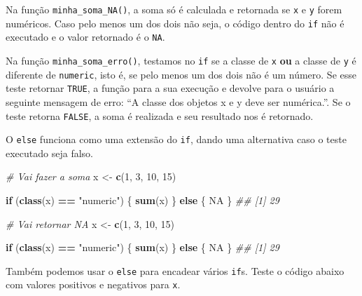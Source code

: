 \documentclass[]{book}
\newenvironment{Shaded}{\begin{snugshade}}{\end{snugshade}}
\newcommand{\CommentTok}[1]{\textcolor[rgb]{0.56,0.35,0.01}{\textit{#1}}}
\newcommand{\ControlFlowTok}[1]{\textcolor[rgb]{0.13,0.29,0.53}{\textbf{#1}}}
\newcommand{\DecValTok}[1]{\textcolor[rgb]{0.00,0.00,0.81}{#1}}
\newcommand{\KeywordTok}[1]{\textcolor[rgb]{0.13,0.29,0.53}{\textbf{#1}}}
\newcommand{\NormalTok}[1]{#1}
\newcommand{\OperatorTok}[1]{\textcolor[rgb]{0.81,0.36,0.00}{\textbf{#1}}}
\newcommand{\OtherTok}[1]{\textcolor[rgb]{0.56,0.35,0.01}{#1}}
\newcommand{\StringTok}[1]{\textcolor[rgb]{0.31,0.60,0.02}{#1}}
\begin{document}
Na função \texttt{minha\_soma\_NA()}, a soma só é calculada e retornada se \texttt{x} e \texttt{y} forem numéricos. Caso pelo menos um dos dois não seja, o código dentro do \texttt{if} não é executado e o valor retornado é o \texttt{NA}.

Na função \texttt{minha\_soma\_erro()}, testamos no \texttt{if} se a classe de \texttt{x} \textbf{ou} a classe de \texttt{y} é diferente de \texttt{numeric}, isto é, se pelo menos um dos dois não é um número. Se esse teste retornar \texttt{TRUE}, a função para a sua execução e devolve para o usuário a seguinte mensagem de erro: ``A classe dos objetos x e y deve ser numérica.''. Se o teste retorna \texttt{FALSE}, a soma é realizada e seu resultado nos é retornado.

O \texttt{else} funciona como uma extensão do \texttt{if}, dando uma alternativa caso o teste executado seja falso.

\begin{Shaded}
\begin{Highlighting}[]
\CommentTok{# Vai fazer  a soma}
\NormalTok{x <-}\StringTok{ }\KeywordTok{c}\NormalTok{(}\DecValTok{1}\NormalTok{, }\DecValTok{3}\NormalTok{, }\DecValTok{10}\NormalTok{, }\DecValTok{15}\NormalTok{)}

\ControlFlowTok{if}\NormalTok{ (}\KeywordTok{class}\NormalTok{(x) }\OperatorTok{==}\StringTok{ "numeric"}\NormalTok{) \{}
  \KeywordTok{sum}\NormalTok{(x)}
\NormalTok{\} }\ControlFlowTok{else}\NormalTok{ \{}
  \OtherTok{NA}
\NormalTok{\}}
\CommentTok{## [1] 29}

\CommentTok{# Vai retornar NA}
\NormalTok{x <-}\StringTok{ }\KeywordTok{c}\NormalTok{(}\DecValTok{1}\NormalTok{, }\DecValTok{3}\NormalTok{, }\DecValTok{10}\NormalTok{, }\DecValTok{15}\NormalTok{)}

\ControlFlowTok{if}\NormalTok{ (}\KeywordTok{class}\NormalTok{(x) }\OperatorTok{==}\StringTok{ "numeric"}\NormalTok{) \{}
  \KeywordTok{sum}\NormalTok{(x)}
\NormalTok{\} }\ControlFlowTok{else}\NormalTok{ \{}
  \OtherTok{NA}
\NormalTok{\}}
\CommentTok{## [1] 29}
\end{Highlighting}
\end{Shaded}

Também podemos usar o \texttt{else} para encadear vários \texttt{if}s. Teste o código abaixo com valores positivos e negativos para \texttt{x}.
\end{document}
